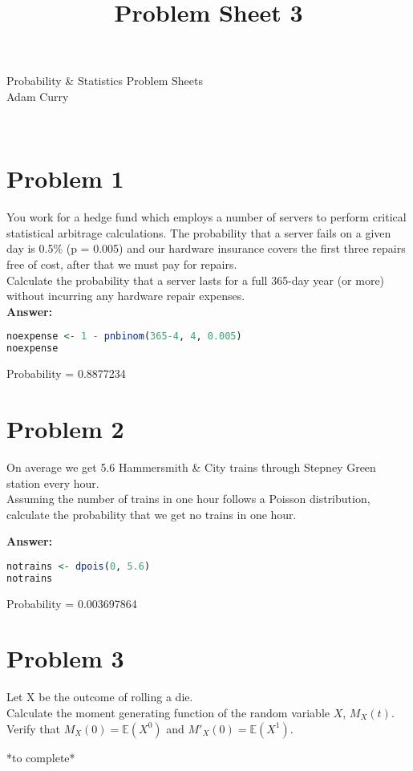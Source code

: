 \documentclass{article}
\title{Problem Sheet 3}
\begin{document}
Probability \& Statistics Problem Sheets\\
Adam Curry
\vspace{3 mm}
\hline
\hspace{25 mm}

\begin{center}
    \large{}\\
\end{center}
\section*{Problem 1}

You work for a hedge fund which employs a number of servers to perform critical
statistical arbitrage calculations. The probability that a server fails on a given day is 0.5\% (p = 0.005) and our hardware insurance covers the first three repairs free of cost, after that we must pay for repairs.\\
Calculate the probability that a server lasts for a full 365-day year (or more) without incurring any hardware repair expenses.\\

\textbf{Answer:}
\begin{lstlisting}[language=R]
noexpense <- 1 - pnbinom(365-4, 4, 0.005)
noexpense
\end{lstlisting}

Probability = 0.8877234

\section*{Problem 2}

On average we get 5.6 Hammersmith \& City trains through Stepney Green station
every hour. \\
Assuming the number of trains in one hour follows a Poisson distribution, calculate the probability that we get no trains in one hour.

\textbf{Answer:}
\begin{lstlisting}[language=R]
notrains <- dpois(0, 5.6)
notrains
\end{lstlisting}

Probability = 0.003697864

\section*{Problem 3}

Let X be the outcome of rolling a die.\\
Calculate the moment generating function of the random variable $X$, $M_X(t)$.\\
Verify that $M_X(0) = \mathbb{E}(X^0)$ and $M′_X(0) = \mathbb{E}(X^1)$.

*to complete*
\end{document}
